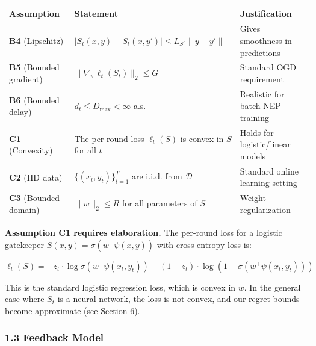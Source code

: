 \documentclass[
  12pt,
]{article}
\begin{document}
\begin{longtable}[]{@{}
  >{\raggedright\arraybackslash}p{}
  >{\raggedright\arraybackslash}p{}
  >{\raggedright\arraybackslash}p{}@{}}
\toprule\noalign{}
\begin{minipage}[b]{\linewidth}\raggedright
Assumption
\end{minipage} & \begin{minipage}[b]{\linewidth}\raggedright
Statement
\end{minipage} & \begin{minipage}[b]{\linewidth}\raggedright
Justification
\end{minipage} \\
\midrule\noalign{}
\endhead
\bottomrule\noalign{}
\endlastfoot
\textbf{B4} (Lipschitz) &
\(|S_t(x,y) - S_t(x,y')| \leq L_S \cdot \|y - y'\|\) & Gives smoothness
in predictions \\
\textbf{B5} (Bounded gradient) & \(\|\nabla_w \ell_t(S_t)\|_2 \leq G\) &
Standard OGD requirement \\
\textbf{B6} (Bounded delay) & \(d_t \leq D_{\max} < \infty\) a.s. &
Realistic for batch NEP training \\
\textbf{C1} (Convexity) & The per-round loss \(\ell_t(S)\) is convex in
\(S\) for all \(t\) & Holds for logistic/linear models \\
\textbf{C2} (IID data) & \(\{(x_t, y_t)\}_{t=1}^T\) are i.i.d. from
\(\mathcal{D}\) & Standard online learning setting \\
\textbf{C3} (Bounded domain) & \(\|w\|_2 \leq R\) for all parameters of
\(S\) & Weight regularization \\
\end{longtable}

\textbf{Assumption C1 requires elaboration.} The per-round loss for a
logistic gatekeeper \(S(x,y) = \sigma(w^\top \psi(x,y))\) with
cross-entropy loss is:

\[\ell_t(S) = -z_t \cdot \log\sigma(w^\top \psi(x_t, y_t)) - (1-z_t) \cdot \log(1 - \sigma(w^\top \psi(x_t, y_t)))\]

This is the standard logistic regression loss, which is convex in \(w\).
In the general case where \(S_t\) is a neural network, the loss is not
convex, and our regret bounds become approximate (see Section 6).

\subsubsection{1.3 Feedback Model}\label{feedback-model}
\end{document}
